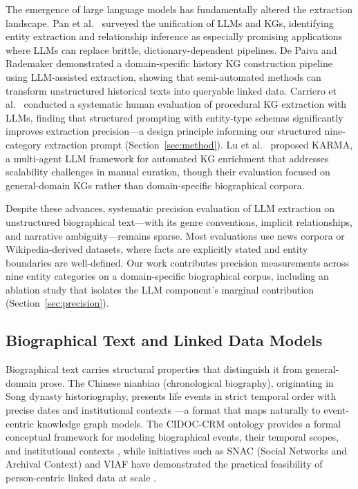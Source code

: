 \documentclass[review]{elsarticle}
\begin{document}
The emergence of large language models has fundamentally altered the extraction landscape. Pan et al.\ \cite{pan2023unifying} surveyed the unification of LLMs and KGs, identifying entity extraction and relationship inference as especially promising applications where LLMs can replace brittle, dictionary-dependent pipelines. De Paiva and Rademaker \cite{depaiva2024brazilian} demonstrated a domain-specific history KG construction pipeline using LLM-assisted extraction, showing that semi-automated methods can transform unstructured historical texts into queryable linked data. Carriero et al.\ \cite{carriero2024human} conducted a systematic human evaluation of procedural KG extraction with LLMs, finding that structured prompting with entity-type schemas significantly improves extraction precision—a design principle informing our structured nine-category extraction prompt (Section~\ref{sec:method}). Lu et al.\ \cite{lu2025karma} proposed KARMA, a multi-agent LLM framework for automated KG enrichment that addresses scalability challenges in manual curation, though their evaluation focused on general-domain KGs rather than domain-specific biographical corpora.

Despite these advances, systematic precision evaluation of LLM extraction on unstructured biographical text—with its genre conventions, implicit relationships, and narrative ambiguity—remains sparse. Most evaluations use news corpora or Wikipedia-derived datasets, where facts are explicitly stated and entity boundaries are well-defined. Our work contributes precision measurements across nine entity categories on a domain-specific biographical corpus, including an ablation study that isolates the LLM component's marginal contribution (Section~\ref{sec:precision}).

\subsection{Biographical Text and Linked Data Models}

Biographical text carries structural properties that distinguish it from general-domain prose. The Chinese nianbiao (chronological biography), originating in Song dynasty historiography, presents life events in strict temporal order with precise dates and institutional contexts \cite{twitchett1962chinese,wilkinson2018chinese}—a format that maps naturally to event-centric knowledge graph models. The CIDOC-CRM ontology provides a formal conceptual framework for modeling biographical events, their temporal scopes, and institutional contexts \cite{doerr2003cidoc}, while initiatives such as SNAC (Social Networks and Archival Context) and VIAF have demonstrated the practical feasibility of person-centric linked data at scale \cite{larson2015connecting}.
\end{document}
